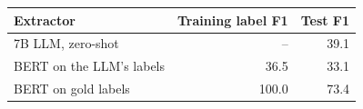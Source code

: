 \begingroup\small\setlength{\tabcolsep}{3pt}
\begin{tabular*}{\linewidth}{@{\extracolsep{\fill}}lrr@{}}
\toprule
Extractor & Training label F1 & Test F1 \\
\midrule
7B LLM, zero-shot & -- & 39.1 \\
BERT on the LLM's labels & 36.5 & 33.1 \\
BERT on gold labels & 100.0 & 73.4 \\
\bottomrule
\end{tabular*}
\endgroup
